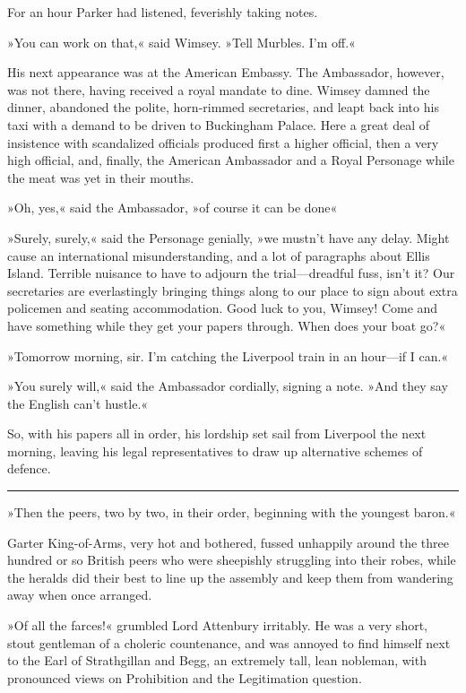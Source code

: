 For an hour Parker had listened, feverishly taking notes.

»You can work on that,« said Wimsey. »Tell Murbles. I'm off.«

His next appearance was at the American Embassy. The Ambassador, however, was not there, having received a royal mandate to dine. Wimsey damned the dinner, abandoned the polite, horn-rimmed secretaries, and leapt back into his taxi with a demand to be driven to Buckingham Palace. Here a great deal of insistence with scandalized officials produced first a higher official, then a very high official, and, finally, the American Ambassador and a Royal Personage while the meat was yet in their mouths.

»Oh, yes,« said the Ambassador, »of course it can be done\longdash«

»Surely, surely,« said the Personage genially, »we mustn't have any delay. Might cause an international misunderstanding, and a lot of paragraphs about Ellis Island. Terrible nuisance to have to adjourn the trial\allowbreak---\allowbreak dreadful fuss, isn't it? Our secretaries are everlastingly bringing things along to our place to sign about extra policemen and seating accommodation. Good luck to you, Wimsey! Come and have something while they get your papers through. When does your boat go?«

»Tomorrow morning, sir. I'm catching the Liverpool train in an hour\allowbreak---\allowbreak if I can.«

»You surely will,« said the Ambassador cordially, signing a note. »And they say the English can't hustle.«

So, with his papers all in order, his lordship set sail from Liverpool the next morning, leaving his legal representatives to draw up alternative schemes of defence. 

\noindent\hfil\rule{0.5\textwidth}{.4pt}\hfil 

»Then the peers, two by two, in their order, beginning with the youngest baron.«

Garter King-of-Arms, very hot and bothered, fussed unhappily around the three hundred or so British peers who were sheepishly struggling into their robes, while the heralds did their best to line up the assembly and keep them from wandering away when once arranged.

»Of all the farces!« grumbled Lord Attenbury irritably. He was a very short, stout gentleman of a choleric countenance, and was annoyed to find himself next to the Earl of Strathgillan and Begg, an extremely tall, lean nobleman, with pronounced views on Prohibition and the Legitimation question.

